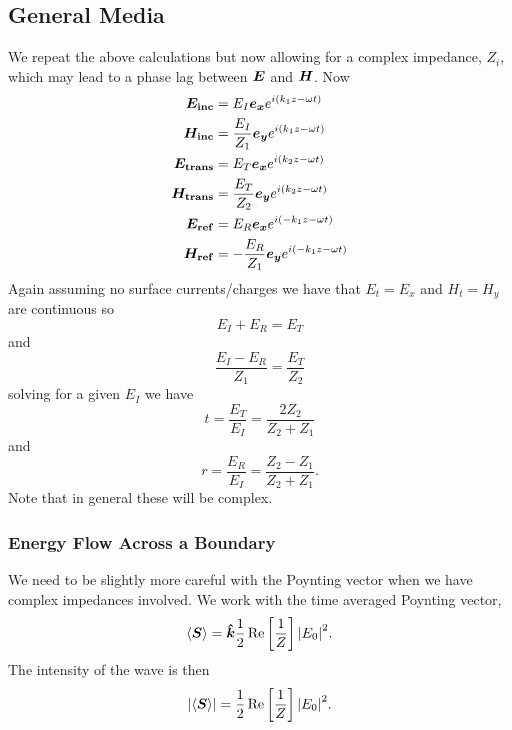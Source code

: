     \subsection{General Media}
    We repeat the above calculations but now allowing for a complex impedance, \(Z_i\), which may lead to a phase lag between \(\bm{E}\) and \(\bm{H}\).
    Now
    \begin{align*}
        \bm{E_{\mathrm{inc}}} &= E_I \bm{e_{x}} e^{i(k_1 z - \omega t)}\\
        \bm{H_{\mathrm{inc}}} &= \frac{E_I}{Z_1} \bm{e_{y}} e^{i(k_1 z - \omega t)}\\
        \bm{E_{\mathrm{trans}}} &= E_T \bm{e_{x}} e^{i(k_2 z - \omega t)}\\
        \bm{H_{\mathrm{trans}}} &= \frac{E_T}{Z_2} \bm{e_{y}} e^{i(k_2 z - \omega t)}\\
        \bm{E_{\mathrm{ref}}} &= E_R \bm{e_{x}} e^{i(-k_1 z - \omega t)}\\
        \bm{H_{\mathrm{ref}}} &= -\frac{E_R}{Z_1} \bm{e_{y}} e^{i(-k_1 z - \omega t)}\\
    \end{align*}
    Again assuming no surface currents/charges we have that \(E_t = E_x\) and \(H_t = H_y\) are continuous so
    \[E_I + E_R = E_T\]
    and
    \[\frac{E_I - E_R}{Z_1} = \frac{E_T}{Z_2}\]
    solving for a given \(E_I\) we have
    \[t = \frac{E_T}{E_I} = \frac{2Z_2}{Z_2 + Z_1}\]
    and
    \[r = \frac{E_R}{E_I} = \frac{Z_2 - Z_1}{Z_2 + Z_1}.\]
    Note that in general these will be complex.
    
    \subsubsection{Energy Flow Across a Boundary}
    We need to be slightly more careful with the Poynting vector when we have complex impedances involved.
    We work with the time averaged Poynting vector,
    \[\langle{\bm{S}}\rangle = \bm{\hat{k}}\frac{1}{2}\Re\left[\frac{1}{Z}\right]\abs{E_0}^2.\]
    The intensity of the wave is then
    \[\abs{\langle{\bm{S}}\rangle} = \frac{1}{2}\Re\left[\frac{1}{Z}\right]\abs{E_0}^2.\]
    
